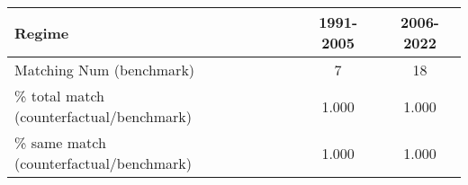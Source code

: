 
\begin{tabular}[t]{lccc}
\toprule
Regime &  & 1991-2005 & 2006-2022\\
\midrule
Matching Num (benchmark) &  & 7 & 18\\
\% total match (counterfactual/benchmark) &  & 1.000 & 1.000\\
\% same match (counterfactual/benchmark) &  & 1.000 & 1.000\\
\bottomrule
\end{tabular}
